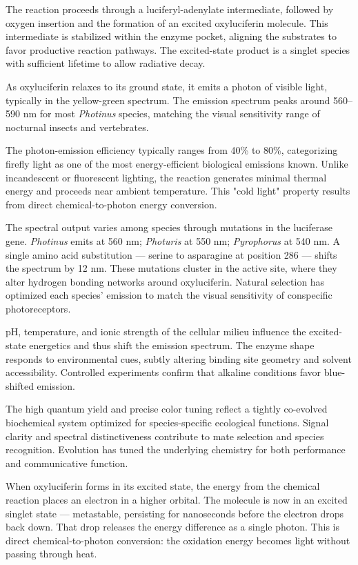 The reaction proceeds through a luciferyl-adenylate intermediate, followed by oxygen insertion and the formation of an excited oxyluciferin molecule. This intermediate is stabilized within the enzyme pocket, aligning the substrates to favor productive reaction pathways. The excited-state product is a singlet species with sufficient lifetime to allow radiative decay.

As oxyluciferin relaxes to its ground state, it emits a photon of visible light, typically in the yellow-green spectrum. The emission spectrum peaks around 560–590 nm for most \emph{Photinus} species, matching the visual sensitivity range of nocturnal insects and vertebrates.

The photon-emission efficiency typically ranges from 40\% to 80\%, categorizing firefly light as one of the most energy-efficient biological emissions known. Unlike incandescent or fluorescent lighting, the reaction generates minimal thermal energy and proceeds near ambient temperature. This "cold light" property results from direct chemical-to-photon energy conversion.

The spectral output varies among species through mutations in the luciferase gene. \emph{Photinus} emits at 560 nm; \emph{Photuris} at 550 nm; \emph{Pyrophorus} at 540 nm. A single amino acid substitution — serine to asparagine at position 286 — shifts the spectrum by 12 nm. These mutations cluster in the active site, where they alter hydrogen bonding networks around oxyluciferin. Natural selection has optimized each species' emission to match the visual sensitivity of conspecific photoreceptors.

pH, temperature, and ionic strength of the cellular milieu influence the excited-state energetics and thus shift the emission spectrum. The enzyme shape responds to environmental cues, subtly altering binding site geometry and solvent accessibility. Controlled experiments confirm that alkaline conditions favor blue-shifted emission.

The high quantum yield and precise color tuning reflect a tightly co-evolved biochemical system optimized for species-specific ecological functions. Signal clarity and spectral distinctiveness contribute to mate selection and species recognition. Evolution has tuned the underlying chemistry for both performance and communicative function.

When oxyluciferin forms in its excited state, the energy from the chemical reaction places an electron in a higher orbital. The molecule is now in an excited singlet state — metastable, persisting for nanoseconds before the electron drops back down. That drop releases the energy difference as a single photon. This is direct chemical-to-photon conversion: the oxidation energy becomes light without passing through heat.

